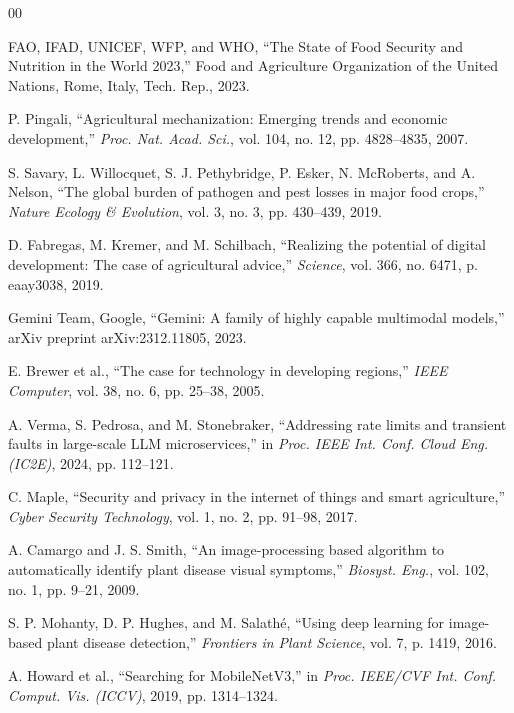 \documentclass[conference]{IEEEtran}
\begin{document}
\begin{thebibliography}{00}

FAO, IFAD, UNICEF, WFP, and WHO, ``The State of Food Security and Nutrition in the World 2023,'' Food and Agriculture Organization of the United Nations, Rome, Italy, Tech. Rep., 2023.

P. Pingali, ``Agricultural mechanization: Emerging trends and economic development,'' \emph{Proc. Nat. Acad. Sci.}, vol. 104, no. 12, pp. 4828--4835, 2007.

S. Savary, L. Willocquet, S. J. Pethybridge, P. Esker, N. McRoberts, and A. Nelson, ``The global burden of pathogen and pest losses in major food crops,'' \emph{Nature Ecology \& Evolution}, vol. 3, no. 3, pp. 430--439, 2019.

D. Fabregas, M. Kremer, and M. Schilbach, ``Realizing the potential of digital development: The case of agricultural advice,'' \emph{Science}, vol. 366, no. 6471, p. eaay3038, 2019.

Gemini Team, Google, ``Gemini: A family of highly capable multimodal models,'' arXiv preprint arXiv:2312.11805, 2023.

E. Brewer et al., ``The case for technology in developing regions,'' \emph{IEEE Computer}, vol. 38, no. 6, pp. 25--38, 2005.

A. Verma, S. Pedrosa, and M. Stonebraker, ``Addressing rate limits and transient faults in large-scale LLM microservices,'' in \emph{Proc. IEEE Int. Conf. Cloud Eng. (IC2E)}, 2024, pp. 112--121.

C. Maple, ``Security and privacy in the internet of things and smart agriculture,'' \emph{Cyber Security Technology}, vol. 1, no. 2, pp. 91--98, 2017.

A. Camargo and J. S. Smith, ``An image-processing based algorithm to automatically identify plant disease visual symptoms,'' \emph{Biosyst. Eng.}, vol. 102, no. 1, pp. 9--21, 2009.

S. P. Mohanty, D. P. Hughes, and M. Salath{\'e}, ``Using deep learning for image-based plant disease detection,'' \emph{Frontiers in Plant Science}, vol. 7, p. 1419, 2016.

A. Howard et al., ``Searching for MobileNetV3,'' in \emph{Proc. IEEE/CVF Int. Conf. Comput. Vis. (ICCV)}, 2019, pp. 1314--1324.


\end{thebibliography}
\end{document}
